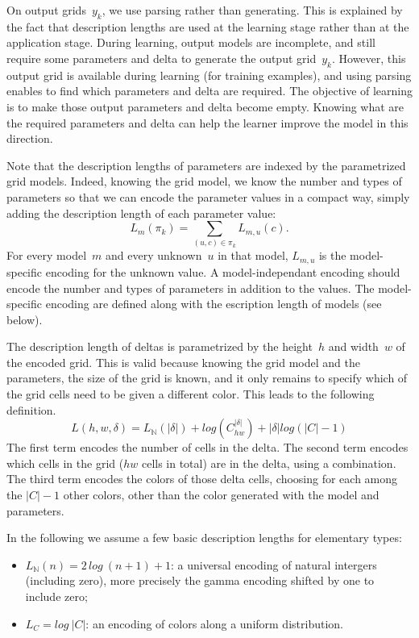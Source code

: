 \documentclass[a4paper]{llncs}
\newcommand{\nat}{\mathbb{N}}
\begin{document}
On output grids~$y_k$, we use parsing rather than generating. This is
explained by the fact that description lengths are used at the
learning stage rather than at the application stage. During learning,
output models are incomplete, and still require some parameters and
delta to generate the output grid~$y_k$. However, this output grid is
available during learning (for training examples), and using parsing
enables to find which parameters and delta are required. The objective
of learning is to make those output parameters and delta become
empty. Knowing what are the required parameters and delta can help the
learner improve the model in this direction.

Note that the description lengths of parameters are indexed by the
parametrized grid models. Indeed, knowing the grid model, we know the
number and types of parameters so that we can encode the parameter
values in a compact way, simply adding the description length of each
parameter value:
\[ L_m(\pi_k) = \sum_{(u,c) \in \pi_k} L_{m,u}(c). \] For every
model~$m$ and every unknown~$u$ in that model, $L_{m,u}$ is the
model-specific encoding for the unknown value. A model-independant
encoding should encode the number and types of parameters in addition
to the values. The model-specific encoding are defined along with the
escription length of models (see below).

The description length of deltas is parametrized by the height~$h$ and
width~$w$ of the encoded grid. This is valid because knowing the grid
model and the parameters, the size of the grid is known, and it only
remains to specify which of the grid cells need to be given a
different color. This leads to the following definition.
\[ L(h,w,\delta) = L_\nat(|\delta|) + log(C_{hw}^{|\delta|}) + |\delta|log(|C|-1) \]
%
The first term encodes the number of cells in the delta. The second
term encodes which cells in the grid ($hw$ cells in total) are in the
delta, using a combination. The third term encodes the colors of those
delta cells, choosing for each among the $|C|-1$ other colors, other
than the color generated with the model and parameters.

In the following we assume a few basic description lengths for
elementary types:
\begin{itemize}
\item $L_\nat(n) = 2\,log\ (n+1) + 1$: a universal encoding of natural
  intergers (including zero), more precisely the gamma encoding
  shifted by one to include zero;
\item $L_C = log\ |C|$: an encoding of colors along a uniform distribution.
\end{itemize}
\end{document}
